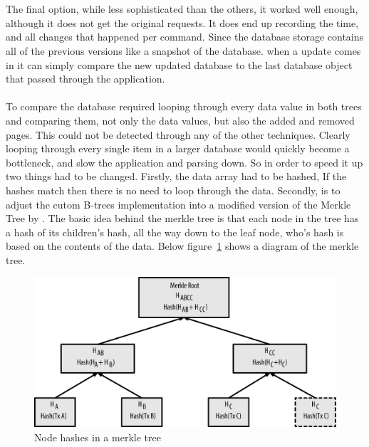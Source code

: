 \\\\
The final option, while less sophisticated than the others, it worked well enough, although it does not get the original requests. It does end up recording the time, and all changes that happened per command. Since the database storage contains all of the previous versions like a snapshot of the database. when a update comes in it can simply compare the new updated database to the last database object that passed through the application.
\\\\
To compare the database required looping through every data value in both trees and comparing them, not only the data values, but also the added and removed pages. This could not be detected through any of the other techniques. Clearly looping through every single item in a larger database would quickly become a bottleneck, and slow the application and parsing down. So in order to speed it up two things had to be changed. Firstly, the data array had to be hashed, If the hashes match then there is no need to loop through the data. Secondly, is to adjust the cutom B-trees implementation into a modified version of the Merkle Tree by \cite{merkletree}. The basic idea behind the merkle tree is that each node in the tree has a hash of its children’s hash, all the way down to the leaf node, who's hash is based on the contents of the data. Below figure~\ref{fig:merkle_tree} shows a diagram of the merkle tree.

\begin{figure}[H]
	\centering
	\includegraphics[scale=1.0]{images/merkle_tree.png}
	\caption{Node hashes in a  merkle tree \citep{bitcoin}}
	\label{fig:merkle_tree}
\end{figure}

